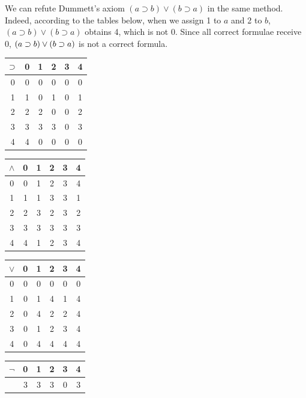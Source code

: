 We can refute Dummett's axiom $(a\supset b)\lor (b\supset
a)$ in the same method.
Indeed, according to the tables below, when we assign 1 to $a$ and 2
to $b$, $(a\supset b)\lor (b\supset a)$ obtains 4, which is not 0.
Since all correct formulae receive 0, $(a\supset b)\lor (b\supset a)$ is not a
correct formula.
 \begin{center}
  \begin{tabular}{c|ccccc}
   $\supset$ & 0& 1& 2& 3& 4\\ \hline
   0& 0& 0& 0& 0& 0\\
   1& 1& 0& 1& 0& 1\\
   2& 2& 2& 0& 0& 2\\
   3& 3& 3& 3& 0& 3\\
   4& 4& 0& 0& 0& 0
  \end{tabular}
  \hfill
  \begin{tabular}{c|ccccc}
   $\wedge$& 0& 1& 2& 3& 4\\ \hline
   0 & 0& 1& 2& 3& 4\\
   1& 1& 1& 3& 3& 1\\
   2& 2& 3& 2& 3& 2\\
   3& 3& 3& 3& 3& 3\\
   4& 4& 1& 2& 3& 4\\
  \end{tabular}
  \hfill
  \begin{tabular}{c|ccccc}
   $\vee$&0 &1 &2 &3 &4 \\ \hline
   0& 0& 0& 0& 0& 0\\
   1& 0& 1& 4& 1& 4\\
   2& 0& 4& 2& 2& 4\\
   3& 0& 1& 2& 3& 4\\
   4& 0& 4& 4& 4& 4\\
  \end{tabular}
  \begin{tabular}{c|ccccc}
   $\neg$& 0& 1& 2& 3& 4\\ \hline
   & 3& 3& 3& 0& 3\\
  \end{tabular}
 \end{center}

